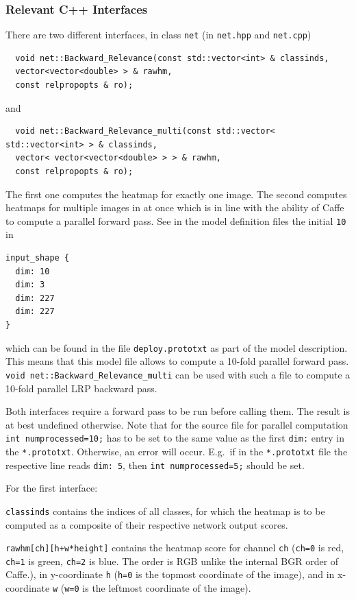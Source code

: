 \documentclass[a4wide]{article}
\begin{document}
\begin{itemize}
\subsubsection*{Relevant C++ Interfaces}
There are two different interfaces, in class \texttt{net} (in \texttt{net.hpp} and  \texttt{net.cpp})
\begin{verbatim}
  void net::Backward_Relevance(const std::vector<int> & classinds, 
  vector<vector<double> > & rawhm, 
  const relpropopts & ro);
\end{verbatim}
and
\begin{verbatim}
  void net::Backward_Relevance_multi(const std::vector< std::vector<int> > & classinds, 
  vector< vector<vector<double> > > & rawhm, 
  const relpropopts & ro);
\end{verbatim}

The first one computes the heatmap for exactly one image. The second computes heatmaps for multiple images in at once which is in line with the ability of Caffe to compute a parallel forward pass. See in the model definition files the initial \texttt{10} in
\begin{verbatim}
input_shape {
  dim: 10
  dim: 3
  dim: 227
  dim: 227
}
\end{verbatim}
which can be found in the file \texttt{deploy.prototxt} as part of the model description.
This means that this model file allows to compute a 10-fold parallel forward pass. \texttt{void net::Backward\_Relevance\_multi} can be used with such a file to compute a 10-fold parallel LRP backward pass.

Both interfaces require a forward pass to be run before calling them. The result is at best undefined otherwise.
Note that for the source file for parallel computation \texttt{int numprocessed=10;} has to be set to the same value as the first \texttt{dim:} entry in the \texttt{*.prototxt}. Otherwise, an error will occur. E.g.~if in the \texttt{*.prototxt} file the respective line reads \texttt{dim: 5}, then \texttt{int numprocessed=5;} should be set.


For the first interface: 

 \texttt{classinds} contains the indices of all classes, for which the heatmap is to be computed as a composite of their respective network output scores.

\texttt{rawhm[ch][h+w*height]} contains the heatmap score for channel \texttt{ch} (\texttt{ch=0} is red, \texttt{ch=1} is green, \texttt{ch=2} is blue. The order is RGB unlike the internal BGR order of Caffe.), in y-coordinate \texttt{h} (\texttt{h=0} is the topmost coordinate of the image), and in x-coordinate \texttt{w} (\texttt{w=0} is the leftmost coordinate of the image).



\end{itemize}
\end{document}
